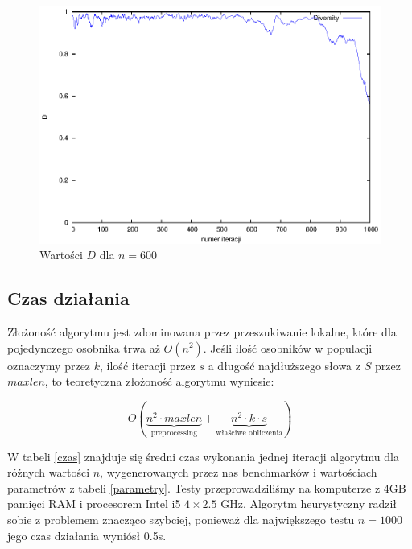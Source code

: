 \documentclass[11pt, a4wide]{mwart}
\begin{document}
\begin{figure}[H]
\caption{Wartości $D$ dla $n = 600$ }
\label{diversity_600}
\begin{center}
  \includegraphics{wykres_diversity_600.eps}
\end{center}
\end{figure}



\subsection{Czas działania}
Złożoność algorytmu jest zdominowana przez przeszukiwanie lokalne, które dla
pojedynczego osobnika trwa aż $O(n^2)$. Jeśli ilość osobników w populacji
oznaczymy przez $k$, ilość iteracji przez $s$ a długość najdłuższego słowa z $S$
przez $maxlen$, to teoretyczna złożoność algorytmu wyniesie:

$$ O(\underbrace{n^2 \cdot maxlen}_{\text{preprocessing}} + 
  \underbrace{n^2 \cdot k \cdot s}_{\text{właściwe obliczenia}}) $$

W tabeli \ref{czas} znajduje się średni czas wykonania jednej iteracji
algorytmu dla różnych wartości $n$, wygenerowanych przez nas benchmarków i
wartościach parametrów z tabeli \ref{parametry}.  Testy przeprowadziliśmy na
komputerze z 4GB pamięci RAM i procesorem Intel i5 $4\times2.5$ GHz. Algorytm
heurystyczny radził sobie z problemem znacząco szybciej, ponieważ
dla największego testu $n = 1000$ jego czas działania wyniósł 0.5s.
\end{document}
